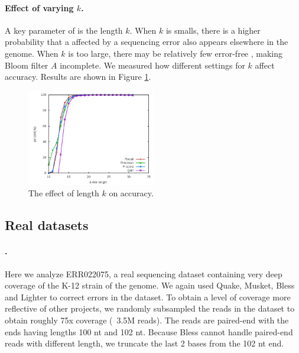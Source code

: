 \documentclass[10pt]{article}
\begin{document}
\paragraph{Effect of varying $k$.}  
A key parameter of \tool is the \kmer length $k$.  When $k$ is smalls, there is a higher probability that a \kmer affected by a sequencing error also appears elsewhere in the genome.  When $k$ is too large, there may be relatively few error-free \kmers, making Bloom filter $A$ incomplete.  We measured how different settings for $k$ affect accuracy.  Results are shown in Figure \ref{fig:kmerLength}. 



\begin{figure}[h!]
\begin{center}
\includegraphics[width=0.5\textwidth]{kmerLength.jpg}
\caption{The effect of \kmer length $k$ on accuracy.\label{fig:kmerLength}}
\end{center}
\end{figure}


\subsection*{Real datasets}
\paragraph{\ecoli.}  Here we analyze ERR022075, a real sequencing dataset containing very deep coverage of the K-12 strain of the \ecoli genome.  We again used Quake, Musket, Bless and Lighter to correct errors in the dataset.
To obtain a level of coverage more reflective of other projects, we randomly subsampled the reads in the dataset to obtain roughly 75x coverage (~3.5M reads).  The reads are paired-end with the ends having lengths 100 nt and 102 nt.  Because Bless cannot handle paired-end reads with different length, we truncate the last 2 bases from the 102 nt end.
\end{document}

